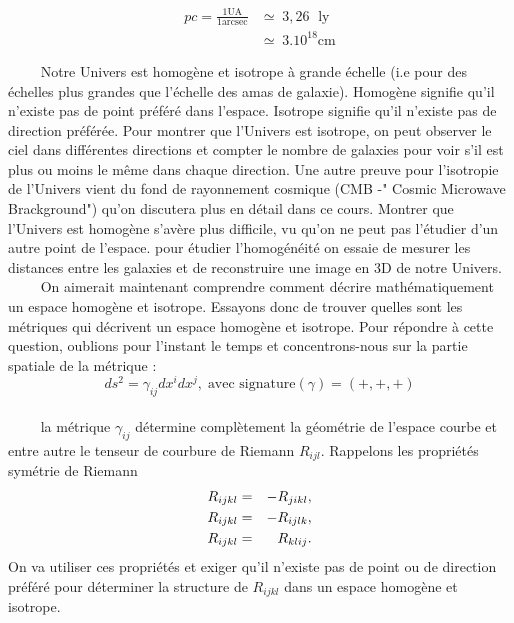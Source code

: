 \documentclass[a4paper,12pt]{report}
\theoremstyle{plain}
\theoremstyle{plain}
\begin{document}
 
 \begin{align*}
 pc=\frac{1\text{UA}}{1\text{arcsec}} &\simeq \; 3,26 \; \text{ ly}\\
 & \simeq \; 3.10^{18}\text{cm}
 \end{align*} 
 
 $\qquad$ Notre Univers est homog\`ene et isotrope \`a grande \'echelle (i.e pour des \'echelles plus grandes que l'\'echelle des amas de galaxie). Homog\`ene signifie qu'il n'existe pas de point pr\'ef\'er\'e dans l'espace. Isotrope signifie qu'il n'existe pas de direction pr\'ef\'er\'ee. Pour montrer que l'Univers est isotrope, on peut observer le ciel dans diff\'erentes directions et compter le nombre de galaxies pour voir s'il est plus ou moins le m\^eme dans chaque direction. Une autre preuve pour l'isotropie de l'Univers vient du fond de rayonnement cosmique (CMB -" Cosmic Microwave Brackground") qu'on discutera plus en d\'etail dans ce cours. Montrer que l'Univers est homog\`ene s'av\`ere plus difficile, vu qu'on ne peut pas l'\'etudier d'un autre point de l'espace. pour \'etudier l'homog\'en\'eit\'e on essaie de mesurer les distances entre les galaxies et de reconstruire une image en 3D de notre Univers. \\
 
 $\qquad$ On aimerait maintenant comprendre comment d\'ecrire math\'ematiquement un espace homog\`ene et isotrope. Essayons donc de trouver quelles sont les m\'etriques qui d\'ecrivent un espace homog\`ene et isotrope. Pour r\'epondre \`a cette question, oublions pour l'instant le temps et concentrons-nous sur la partie spatiale de la m\'etrique :
 \begin{equation*}
 ds^2=\gamma_{ij}dx^idx^j, \;  \text{avec signature}\left(\gamma \right) =\left(+,+,+ \right) 
 \end{equation*} \\
 
 $\qquad$ la m\'etrique $\gamma_{ij}$ d\'etermine compl\`etement la g\'eom\'etrie de l'espace courbe et entre autre le tenseur de courbure de Riemann $R_{ijl}$. Rappelons les propri\'et\'es sym\'etrie de Riemann 
 \begin{eqnarray}
  R_{ijkl} &=& -R_{jikl}, \cr 
  R_{ijkl} &=& -R_{ijlk},\cr
  R_{ijkl} &=& R_{klij}.
 \end{eqnarray} 
 On va utiliser ces propri\'et\'es et exiger qu'il n'existe pas de point ou de direction pr\'ef\'er\'e pour d\'eterminer la structure de $R_{ijkl}$ dans un espace homog\`ene et isotrope.\\
 
\end{document}
